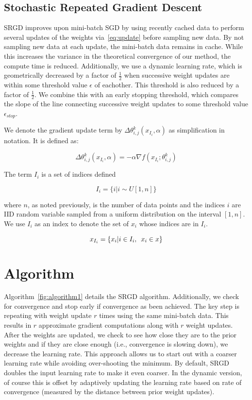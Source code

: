 \documentclass[,conference,compsoc]{IEEEtran}
\begin{document}
\subsection{Stochastic Repeated Gradient Descent}
SRGD improves upon mini-batch SGD by using recently cached data to perform
several updates of the weights via~\ref{eq:update} before sampling new data. By
not sampling new data at each update, the mini-batch data remains in cache.
While this increases the variance in the theoretical convergence of our method,
the compute time is reduced. Additionally, we use a dynamic learning
rate, which is geometrically decreased by a factor of $\frac{1}{2}$ when successive
weight updates are within some threshold value $\epsilon$ of eachother. This
threshold is also reduced by a factor of $\frac{1}{2}$. We combine this with an
early stopping threshold, which compares the slope of the line connecting
successive weight updates to some threshold value $\epsilon_{stop}$.

We denote the gradient update term by $\Delta\theta_{i,j}^{k}(x_{I_i}, \alpha)$ as
simplification in notation. It is defined as:

\begin{equation*}
    \Delta\theta_{i,j}^{k}(x_{I_i}, \alpha) = -\alpha \nabla f(x_{I_i}; \theta_{i,j}^k)
\end{equation*}

The term $I_i$ is a set of indices defined

\begin{equation*}
    I_i = \{i | i \sim U[1,n]\}
\end{equation*}

where $n$, as noted previously, is the number of data points and the indices $i$
are IID random variable sampled from a uniform distribution on the interval
$[1,n]$. We use $I_i$ as an index to denote the set of $x_i$ whose indices are
in $I_i$.

\begin{equation*}
    x_{I_i} = \{ x_i | i \in I_i, \hspace{.5em}x_i \in x \}
\end{equation*}

\section{Algorithm}
Algorithm~\ref{fig:algorithm1}  details the SRGD algorithm. Additionally, we check for convergence
and stop early if convergence as been achieved. The key step is repeating with
weight update $r$ times using the same mini-batch data. This results in $r$
approximate gradient computations along with $r$ weight updates. After the
weights are updated, we check to see how close they are to the prior weights and
if they are close enough (i.e., convergence is slowing down), we decrease the
learning rate. This approach allows us to start out with a coarser learning rate
while avoiding over-shooting the minimum. By default, SRGD doubles the input
learning rate to make it even coarser. In the dynamic version, of
course this is offset by adaptively updating the learning rate based on
rate of convergence (measured by the distance between prior weight updates).
\end{document}
